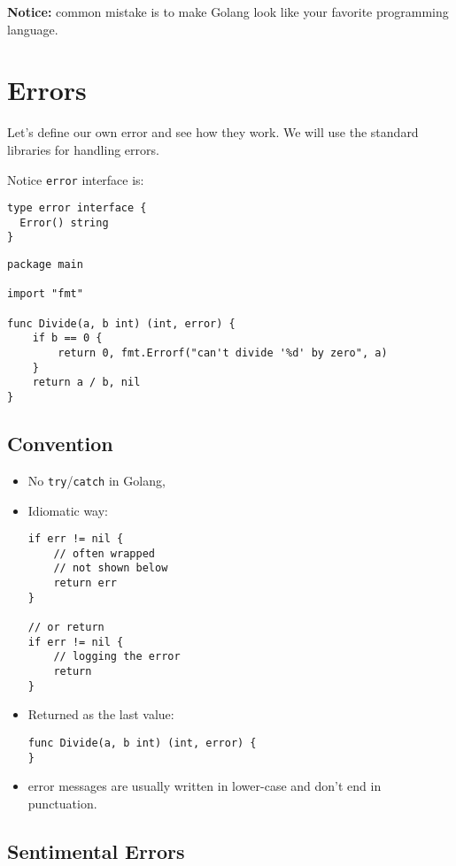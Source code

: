 \documentclass[11pt, letterpaper]{article}
\begin{document}
\bigskip
\textbf{Notice:} common mistake is to make Golang look like your favorite programming language.

\section{Errors}
Let's define our own error and see how they work. We will use the standard libraries for handling errors.

Notice \verb|error| interface is:

\begin{verbatim}
type error interface {
  Error() string
}
\end{verbatim}

\begin{verbatim}
package main

import "fmt"

func Divide(a, b int) (int, error) {
    if b == 0 {
        return 0, fmt.Errorf("can't divide '%d' by zero", a)
    }
    return a / b, nil
}
\end{verbatim}

\subsection{Convention}

\begin{itemize}%
\item No \verb|try|/\verb|catch| in Golang,
\item Idiomatic way: \begin{verbatim}
if err != nil {
	// often wrapped
	// not shown below
	return err
}

// or return
if err != nil {
	// logging the error
	return
}
\end{verbatim}
\item Returned as the last value: \begin{verbatim}
func Divide(a, b int) (int, error) {
}
\end{verbatim}
\item error messages are usually written in lower-case and don’t end in punctuation.
\end{itemize}

\subsection{Sentimental Errors}
\end{document}
